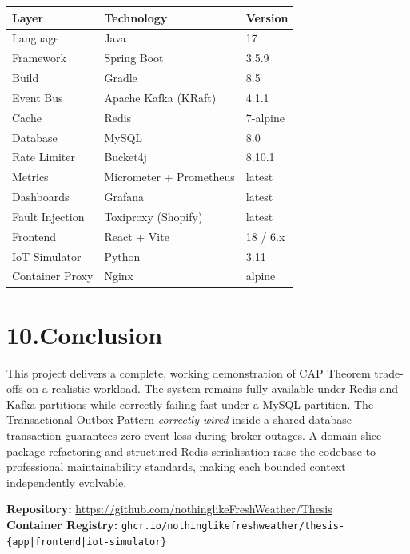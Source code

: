 \documentclass[11pt,a4paper]{article}
\begin{document}
\begin{center}
\small
\begin{tabular}{@{}lll@{}}
\toprule
\textbf{Layer} & \textbf{Technology} & \textbf{Version} \\
\midrule
Language        & Java                & 17 \\
Framework       & Spring Boot         & 3.5.9 \\
Build           & Gradle              & 8.5 \\
Event Bus       & Apache Kafka (KRaft)& 4.1.1 \\
Cache           & Redis               & 7-alpine \\
Database        & MySQL               & 8.0 \\
Rate Limiter    & Bucket4j            & 8.10.1 \\
Metrics         & Micrometer + Prometheus & latest \\
Dashboards      & Grafana             & latest \\
Fault Injection & Toxiproxy (Shopify) & latest \\
Frontend        & React + Vite        & 18 / 6.x \\
IoT Simulator   & Python              & 3.11 \\
Container Proxy & Nginx               & alpine \\
\bottomrule
\end{tabular}
\end{center}

\section*{10.\quad Conclusion}

This project delivers a complete, working demonstration of CAP Theorem
trade-offs on a realistic workload.
The system remains fully available under Redis and Kafka partitions while
correctly failing fast under a MySQL partition.
The Transactional Outbox Pattern \emph{correctly wired} inside a shared
database transaction guarantees zero event loss during broker outages.
A domain-slice package refactoring and structured Redis serialisation
raise the codebase to professional maintainability standards,
making each bounded context independently evolvable.

\vspace{1em}
\begin{mdframed}[backgroundcolor=success!5, linecolor=success!40, linewidth=0.8pt]
\small\noindent
\textbf{Repository:}
\url{https://github.com/nothinglikeFreshWeather/Thesis}\\
\textbf{Container Registry:}
\texttt{ghcr.io/nothinglikefreshweather/thesis-\{app|frontend|iot-simulator\}}
\end{mdframed}
\end{document}
